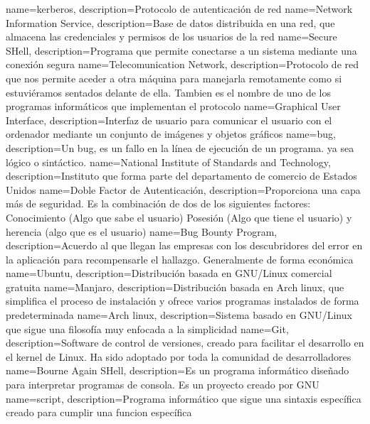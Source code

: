 {
	name=kerberos,
	description={Protocolo de autenticación de red}
}
{
	name=Network Information Service,
	description={Base de datos distribuida en una red, que almacena las credenciales y permisos de los usuarios de la red}
}
{
	name=Secure SHell,
	description={Programa que permite conectarse a un sistema mediante una conexión segura}
}
{
	name=Telecomunication Network,
	description={Protocolo de red que nos permite aceder a otra máquina para manejarla remotamente como si estuviéramos sentados delante de ella. Tambien es el nombre de uno de los programas informáticos que implementan el protocolo}
}
{
	name=Graphical User Interface,
	description={Interfaz de usuario para comunicar el usuario con el ordenador mediante un conjunto de imágenes y objetos gráficos}
}
{
	name=bug,
	description={Un bug, es un fallo en la línea de ejecución de un programa. ya sea lógico o sintáctico.}
}
{
	name=National Institute of Standards and Technology,
	description={Instituto que forma parte del departamento de comercio de Estados Unidos}
}
{
	name=Doble Factor de Autenticación,
	description={Proporciona una capa más de seguridad. Es la combinación de dos de los siguientes factores: Conocimiento (Algo que sabe el usuario) Posesión (Algo que tiene el usuario) y herencia (algo que es el usuario)}
}
{
	name=Bug Bounty Program,
	description={Acuerdo al que llegan las empresas con los descubridores del error en la aplicación para recompensarle el hallazgo. Generalmente de forma económica}
}
{
	name=Ubuntu,
	description={Distribución basada en GNU/Linux comercial gratuita}
}
{
	name=Manjaro,
	description={Distribución basada en Arch linux, que simplifica el proceso de instalación y ofrece varios programas instalados de forma predeterminada}
}
{
	name=Arch linux,
	description={Sistema basado en GNU/Linux que sigue una filosofía muy enfocada a la simplicidad}
}
{
	name=Git,
	description={Software de control de versiones, creado para facilitar el desarrollo en el kernel de Linux. Ha sido adoptado por toda la comunidad de desarrolladores}
}
{
	name=Bourne Again SHell,
	description={Es un programa informático diseñado para interpretar programas de consola. Es un proyecto creado por GNU}
}
{
	name=script,
	description={Programa informático que sigue una sintaxis específica creado para cumplir una funcion específica}
}
